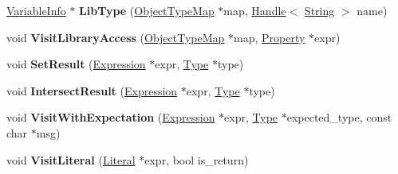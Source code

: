 \begin{DoxyCompactItemize}
\item 
\hyperlink{structv8_1_1internal_1_1_asm_typer_1_1_variable_info}{Variable\+Info} $\ast$ {\bfseries Lib\+Type} (\hyperlink{classv8_1_1internal_1_1_zone_map}{Object\+Type\+Map} $\ast$map, \hyperlink{classv8_1_1internal_1_1_handle}{Handle}$<$ \hyperlink{classv8_1_1internal_1_1_string}{String} $>$ name)\hypertarget{classv8_1_1internal_1_1_asm_typer_a0c89d09cb6e0d06632c8522c7ba3fbad}{}\label{classv8_1_1internal_1_1_asm_typer_a0c89d09cb6e0d06632c8522c7ba3fbad}

\item 
void {\bfseries Visit\+Library\+Access} (\hyperlink{classv8_1_1internal_1_1_zone_map}{Object\+Type\+Map} $\ast$map, \hyperlink{classv8_1_1internal_1_1_property}{Property} $\ast$expr)\hypertarget{classv8_1_1internal_1_1_asm_typer_a7da09f97dcccf14476ebaed848756d67}{}\label{classv8_1_1internal_1_1_asm_typer_a7da09f97dcccf14476ebaed848756d67}

\item 
void {\bfseries Set\+Result} (\hyperlink{classv8_1_1internal_1_1_expression}{Expression} $\ast$expr, \hyperlink{classv8_1_1internal_1_1_type}{Type} $\ast$type)\hypertarget{classv8_1_1internal_1_1_asm_typer_ad48ac0ba77ea558bb071e5d6e48edcac}{}\label{classv8_1_1internal_1_1_asm_typer_ad48ac0ba77ea558bb071e5d6e48edcac}

\item 
void {\bfseries Intersect\+Result} (\hyperlink{classv8_1_1internal_1_1_expression}{Expression} $\ast$expr, \hyperlink{classv8_1_1internal_1_1_type}{Type} $\ast$type)\hypertarget{classv8_1_1internal_1_1_asm_typer_a447a2a69dcc3725a3401c1941c8cc43b}{}\label{classv8_1_1internal_1_1_asm_typer_a447a2a69dcc3725a3401c1941c8cc43b}

\item 
void {\bfseries Visit\+With\+Expectation} (\hyperlink{classv8_1_1internal_1_1_expression}{Expression} $\ast$expr, \hyperlink{classv8_1_1internal_1_1_type}{Type} $\ast$expected\+\_\+type, const char $\ast$msg)\hypertarget{classv8_1_1internal_1_1_asm_typer_ac79d337227224cd2eaa38ba0d10deb22}{}\label{classv8_1_1internal_1_1_asm_typer_ac79d337227224cd2eaa38ba0d10deb22}

\item 
void {\bfseries Visit\+Literal} (\hyperlink{classv8_1_1internal_1_1_literal}{Literal} $\ast$expr, bool is\+\_\+return)\hypertarget{classv8_1_1internal_1_1_asm_typer_af5af27b913a62a916fc6ff51b3ef58d9}{}\label{classv8_1_1internal_1_1_asm_typer_af5af27b913a62a916fc6ff51b3ef58d9}


\end{DoxyCompactItemize}
